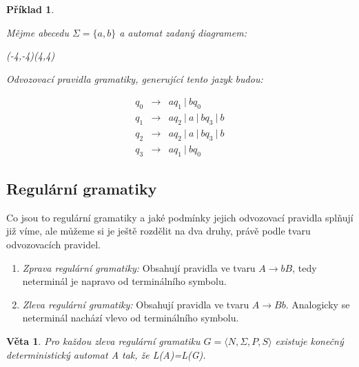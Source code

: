 \documentclass[10pt, a4paper, titlepage]{article}
\theoremstyle{note}
\newtheorem{veta}{Věta}
\newtheorem{priklad}{Příklad}
\begin{document}
\begin{priklad}\label{priklad-4}

Mějme abecedu $\Sigma = \lbrace a,b \rbrace$ a automat zadaný diagramem:
\begin{center}
\begin{VCPicture}{(-4,-4)(4,4)}
\end{VCPicture}
\end{center}

Odvozovací pravidla gramatiky, generující tento jazyk budou:

\begin{eqnarray*}
q_0 &\rightarrow& aq_1\ |\ bq_0 \\
q_1 &\rightarrow& aq_2\ |\ a\ |\ bq_3\ |\  b \\
q_2 &\rightarrow& aq_2\ |\ a\ |\ bq_3\ |\  b \\
q_3 &\rightarrow& aq_1\ |\ bq_0
\end{eqnarray*}

\end{priklad}

\subsection{Regulární gramatiky}

Co jsou to regulární gramatiky a jaké podmínky jejich odvozovací pravidla splňují již víme, ale můžeme si je ještě rozdělit na dva druhy, právě podle tvaru odvozovacích pravidel.

\begin{enumerate}

\item
\textit{Zprava regulární gramatiky:}
Obsahují pravidla ve tvaru $ A \rightarrow bB $, tedy neterminál je napravo od terminálního symbolu.
\item
\textit{Zleva regulární gramatiky:}
Obsahují pravidla ve tvaru $ A \rightarrow Bb $. Analogicky se neterminál nachází vlevo od terminálního symbolu.
\end{enumerate}

\begin{veta}
Pro každou zleva regulární gramatiku $ G = \langle N,\Sigma,P,S \rangle $ existuje konečný deterministický automat \textit{A} tak, že \textit{L(A)=L(G)}.
\end{veta}
\end{document}
